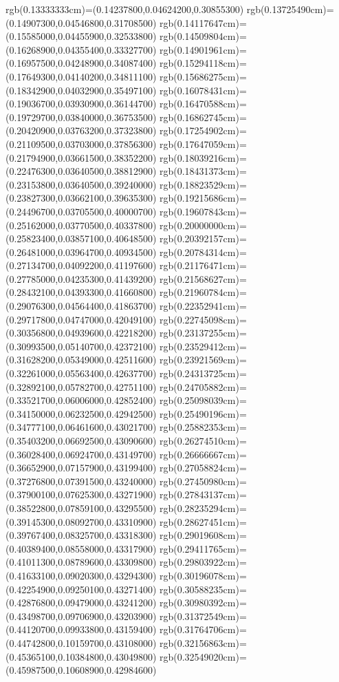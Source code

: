 {{rgb(0.13333333cm)=(0.14237800,0.04624200,0.30855300)
rgb(0.13725490cm)=(0.14907300,0.04546800,0.31708500)
rgb(0.14117647cm)=(0.15585000,0.04455900,0.32533800)
rgb(0.14509804cm)=(0.16268900,0.04355400,0.33327700)
rgb(0.14901961cm)=(0.16957500,0.04248900,0.34087400)
rgb(0.15294118cm)=(0.17649300,0.04140200,0.34811100)
rgb(0.15686275cm)=(0.18342900,0.04032900,0.35497100)
rgb(0.16078431cm)=(0.19036700,0.03930900,0.36144700)
rgb(0.16470588cm)=(0.19729700,0.03840000,0.36753500)
rgb(0.16862745cm)=(0.20420900,0.03763200,0.37323800)
rgb(0.17254902cm)=(0.21109500,0.03703000,0.37856300)
rgb(0.17647059cm)=(0.21794900,0.03661500,0.38352200)
rgb(0.18039216cm)=(0.22476300,0.03640500,0.38812900)
rgb(0.18431373cm)=(0.23153800,0.03640500,0.39240000)
rgb(0.18823529cm)=(0.23827300,0.03662100,0.39635300)
rgb(0.19215686cm)=(0.24496700,0.03705500,0.40000700)
rgb(0.19607843cm)=(0.25162000,0.03770500,0.40337800)
rgb(0.20000000cm)=(0.25823400,0.03857100,0.40648500)
rgb(0.20392157cm)=(0.26481000,0.03964700,0.40934500)
rgb(0.20784314cm)=(0.27134700,0.04092200,0.41197600)
rgb(0.21176471cm)=(0.27785000,0.04235300,0.41439200)
rgb(0.21568627cm)=(0.28432100,0.04393300,0.41660800)
rgb(0.21960784cm)=(0.29076300,0.04564400,0.41863700)
rgb(0.22352941cm)=(0.29717800,0.04747000,0.42049100)
rgb(0.22745098cm)=(0.30356800,0.04939600,0.42218200)
rgb(0.23137255cm)=(0.30993500,0.05140700,0.42372100)
rgb(0.23529412cm)=(0.31628200,0.05349000,0.42511600)
rgb(0.23921569cm)=(0.32261000,0.05563400,0.42637700)
rgb(0.24313725cm)=(0.32892100,0.05782700,0.42751100)
rgb(0.24705882cm)=(0.33521700,0.06006000,0.42852400)
rgb(0.25098039cm)=(0.34150000,0.06232500,0.42942500)
rgb(0.25490196cm)=(0.34777100,0.06461600,0.43021700)
rgb(0.25882353cm)=(0.35403200,0.06692500,0.43090600)
rgb(0.26274510cm)=(0.36028400,0.06924700,0.43149700)
rgb(0.26666667cm)=(0.36652900,0.07157900,0.43199400)
rgb(0.27058824cm)=(0.37276800,0.07391500,0.43240000)
rgb(0.27450980cm)=(0.37900100,0.07625300,0.43271900)
rgb(0.27843137cm)=(0.38522800,0.07859100,0.43295500)
rgb(0.28235294cm)=(0.39145300,0.08092700,0.43310900)
rgb(0.28627451cm)=(0.39767400,0.08325700,0.43318300)
rgb(0.29019608cm)=(0.40389400,0.08558000,0.43317900)
rgb(0.29411765cm)=(0.41011300,0.08789600,0.43309800)
rgb(0.29803922cm)=(0.41633100,0.09020300,0.43294300)
rgb(0.30196078cm)=(0.42254900,0.09250100,0.43271400)
rgb(0.30588235cm)=(0.42876800,0.09479000,0.43241200)
rgb(0.30980392cm)=(0.43498700,0.09706900,0.43203900)
rgb(0.31372549cm)=(0.44120700,0.09933800,0.43159400)
rgb(0.31764706cm)=(0.44742800,0.10159700,0.43108000)
rgb(0.32156863cm)=(0.45365100,0.10384800,0.43049800)
rgb(0.32549020cm)=(0.45987500,0.10608900,0.42984600)
}}
